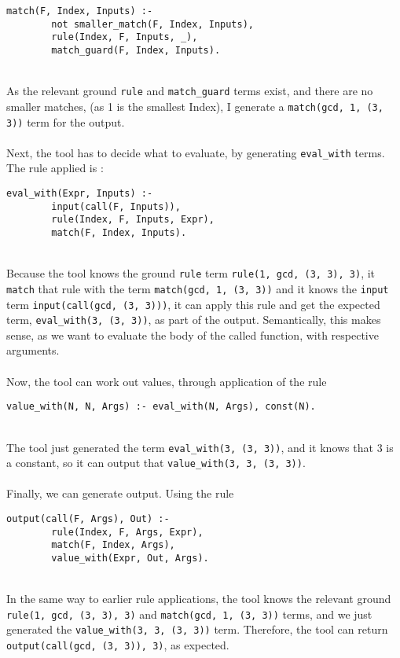 \begin{lstlisting}[firstnumber=197]
match(F, Index, Inputs) :- 
		not smaller_match(F, Index, Inputs), 
		rule(Index, F, Inputs, _), 
		match_guard(F, Index, Inputs).
\end{lstlisting}
\mbox{} \\
As the relevant ground \lstinline{rule} and \lstinline{match_guard} terms exist, and there are no smaller matches, (as 1 is the smallest Index), I generate a \lstinline{match(gcd, 1, (3, 3))} term for the output. \\ \\ %
Next, the tool has to decide what to evaluate, by generating \lstinline{eval_with} terms. The rule applied is :\\ %

\begin{lstlisting}[firstnumber=128]
eval_with(Expr, Inputs) :- 
		input(call(F, Inputs)), 
		rule(Index, F, Inputs, Expr), 
		match(F, Index, Inputs).
\end{lstlisting}
\mbox{} \\
Because the tool knows the ground \lstinline{rule} term \lstinline{rule(1, gcd, (3, 3), 3)}, it \lstinline{match} that rule with the term \lstinline{match(gcd, 1, (3, 3))} and it knows the \lstinline{input} term \lstinline{input(call(gcd, (3, 3)))}, it can apply this rule and get the expected term, \lstinline{eval_with(3, (3, 3))}, as part of the output. Semantically, this makes sense, as we want to evaluate the body of the called function, with respective arguments. \\ \\%
Now, the tool can work out values, through application of the rule \\

\begin{lstlisting}[firstnumber=97]
value_with(N, N, Args) :- eval_with(N, Args), const(N).
\end{lstlisting}
\mbox{} \\
The tool just generated the term \lstinline{eval_with(3, (3, 3))}, and it knows that 3 is a constant, so it can output that \lstinline{value_with(3, 3, (3, 3))}. \\ \\
Finally, we can generate output. Using the rule \\

\begin{lstlisting}[firstnumber=55]
output(call(F, Args), Out) :- 
		rule(Index, F, Args, Expr), 
		match(F, Index, Args), 
		value_with(Expr, Out, Args).
\end{lstlisting}
\mbox{} \\
In the same way to earlier rule applications, the tool knows the relevant ground \lstinline{rule(1, gcd, (3, 3), 3)} and \lstinline{match(gcd, 1, (3, 3))} terms, and we just generated the \lstinline{value_with(3, 3, (3, 3))} term. Therefore, the tool can return \lstinline{output(call(gcd, (3, 3)), 3)}, as expected.

